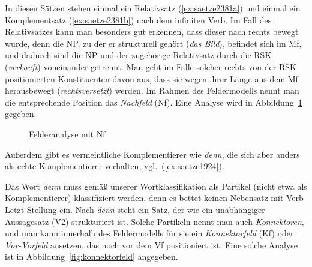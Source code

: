 
In diesen Sätzen stehen einmal ein Relativsatz (\ref{ex:saetze2381a}) und einmal ein Komplementsatz (\ref{ex:saetze2381b}) nach dem infiniten Verb.
Im Fall des Relativsatzes kann man besonders gut erkennen, dass dieser nach rechts bewegt wurde, denn die NP, zu der er strukturell gehört (\textit{das Bild}), befindet sich im Mf, und dadurch sind die NP und der zugehörige Relativsatz durch die RSK (\textit{verkauft}) voneinander getrennt.
Man geht im Falle solcher rechts von der RSK positionierten Konstituenten davon aus, dass sie wegen ihrer Länge aus dem Mf herausbewegt (\textit{rechtsversetzt}) werden.
Im Rahmen des Feldermodells nennt man die entsprechende Position das \textit{Nachfeld} (Nf).
Eine Analyse wird in Abbildung~\ref{fig:nachfeld} gegeben.


\begin{figure}
  \centering
  \caption{Felderanalyse mit Nf}
  \label{fig:nachfeld}
\end{figure}

Außerdem gibt es vermeintliche Komplementierer wie \textit{denn}, die sich aber anders als echte Komplementierer verhalten, vgl.\ (\ref{ex:saetze1924}).

\begin{exe}
  \ex\label{ex:saetze1924}
  \begin{xlist}
  \end{xlist}
\end{exe}


Das Wort \textit{denn} muss gemäß unserer Wortklassifikation als Partikel (nicht etwa als Komplementierer) klassifiziert werden, denn es bettet keinen Nebensatz mit Verb-Letzt-Stellung ein.
Nach \textit{denn} steht ein Satz, der wie ein unabhängiger Aussagesatz (V2) strukturiert ist.
Solche Partikeln nennt man auch \textit{Konnektoren}, und man kann innerhalb des Feldermodells für sie ein \textit{Konnektorfeld} (Kf) oder \textit{Vor-Vorfeld} ansetzen, das noch vor dem Vf positioniert ist.
Eine solche Analyse ist in Abbildung~\ref{fig:konnektorfeld} angegeben.

